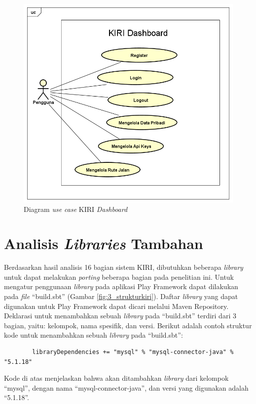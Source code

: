 \begin{figure}[htbp]
	\centering
		\includegraphics[scale=0.5]{Gambar/3_usecase.png}
	\caption{Diagram \textit{use case} KIRI \textit{Dashboard}}
	\label{fig:3_usecase}
\end{figure}

\section{Analisis \textit{Libraries} Tambahan}
\label{sec:analisislibrary}
Berdasarkan hasil analisis 16 bagian sistem KIRI, dibutuhkan beberapa \textit{library} untuk dapat melakukan \textit{porting} beberapa bagian pada penelitian ini. Untuk mengatur penggunaan \textit{library} pada aplikasi Play Framework dapat dilakukan pada \textit{file} ``build.sbt''\cite{playframeworkweb} (Gambar \ref{fig:3_strukturkiri}). Daftar \textit{library} yang dapat digunakan untuk Play Framework dapat dicari melalui Maven Repository\cite{maven}. Deklarasi untuk menambahkan sebuah \textit{library} pada ``build.sbt'' terdiri dari 3 bagian, yaitu: kelompok, nama spesifik, dan versi. Berikut adalah contoh struktur kode untuk menambahkan sebuah \textit{library} pada ``build.sbt'':
\begin{lstlisting}
		libraryDependencies += "mysql" % "mysql-connector-java" % "5.1.18"
\end{lstlisting}
Kode di atas menjelaskan bahwa akan ditambahkan \textit{library} dari kelompok ``mysql'', dengan nama ``mysql-connector-java'', dan versi yang digunakan adalah ``5.1.18''.

